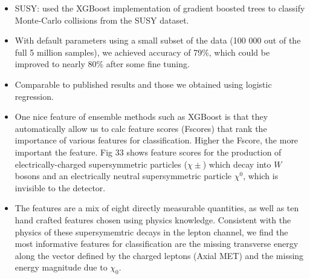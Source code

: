 \documentclass[norsk,a4paper,11pt]{article}
\begin{document}
\begin{itemize}
	\item SUSY: used the XGBoost implementation of gradient boosted trees to classify Monte-Carlo collisions from the SUSY dataset.
	\item With default parameters using a small subset of the data (100 000 out of the full 5 million samples), we achieved accuracy of 79\%, which could be improved to nearly 80\% after some fine tuning.
	\item Comparable to published results and those we obtained using logistic regression.
	\item One nice feature of ensemble methods such as XGBoost is that they automatically allow us to calc feature scores (Fscores) that rank the importance of various features for classification. Higher the Fscore, the more important the feature. Fig 33 shows feature scores for the production of electrically-charged supersymmetric particles ($\chi \pm$) which decay into $W$ bosons and an electrically neutral supersymmetric particle $\chi^0$, which is invisible to the detector.
	\item The features are a mix of eight directly measurable quantities, as well as ten hand crafted features chosen using physics knowledge. Consistent with the physics of these supersymemtric decays in the lepton channel, we find the most informative features for classification are the missing transverse energy along the vector defined by the charged leptons (Axial MET) and the missing energy magnitude due to $\chi_0$.
\end{itemize}
\end{document}
